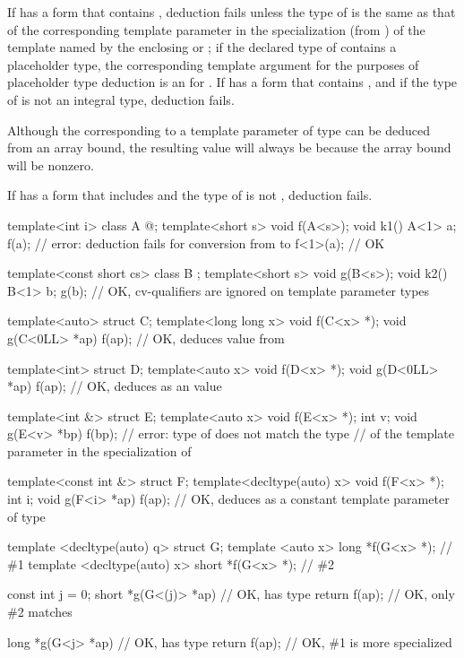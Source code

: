 \pnum
If  has a form that contains ,
deduction fails unless the type of  is the same as that
of the corresponding template parameter
 in the specialization (from )
of the template named by the enclosing  or
;
if the declared type of  contains a placeholder type,
the corresponding template argument for the purposes of
placeholder type deduction
is an  for .
If  has a form that contains \tcode{[i]}, and if the type of
 is not an integral type, deduction fails.
\begin{footnote}
Although the
corresponding to a template parameter of type
can be deduced from an array bound, the resulting value will always be
because the array bound will be nonzero.
\end{footnote}
If  has a form that includes  and
the type of  is not , deduction fails.
\begin{example}
\begin{codeblock}
template<int i> class A { @\commentellip@ };
template<short s> void f(A<s>);
void k1() {
  A<1> a;
  f(a);                 // error: deduction fails for conversion from  to 
  f<1>(a);              // OK
}

template<const short cs> class B { };
template<short s> void g(B<s>);
void k2() {
  B<1> b;
  g(b);                 // OK, cv-qualifiers are ignored on template parameter types
}

template<auto> struct C;
template<long long x> void f(C<x> *);
void g(C<0LL> *ap) {
  f(ap);                // OK, deduces  value from 
}

template<int> struct D;
template<auto x> void f(D<x> *);
void g(D<0LL> *ap) {
  f(ap);                // OK, deduces  as an  value
}

template<int &> struct E;
template<auto x> void f(E<x> *);
int v;
void g(E<v> *bp) {
  f(bp);                // error: type  of  does not match the  type
}                       // of the template parameter in the  specialization of 

template<const int &> struct F;
template<decltype(auto) x> void f(F<x> *);
int i;
void g(F<i> *ap) {
  f(ap);                // OK, deduces  as a constant template parameter of type 
}

template <decltype(auto) q> struct G;
template <auto x> long *f(G<x> *);              // \#1
template <decltype(auto) x> short *f(G<x> *);   // \#2

const int j = 0;
short *g(G<(j)> *ap) {  // OK,  has type 
  return f(ap);         // OK, only \#2 matches
}

long *g(G<j> *ap) {     // OK,  has type 
  return f(ap);         // OK, \#1 is more specialized
}
\end{codeblock}
\end{example}

